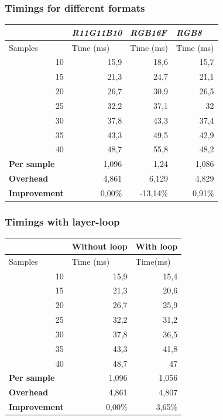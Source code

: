 \documentclass{beamer}
\begin{document}
\begin{frame}
\frametitle{Timings for different formats}
\begin{center}
\begin{tabular}{|r|r|r|r|}
\hline
\multicolumn{1}{|l|}{} & \multicolumn{1}{l|}{\textbf{\textit{R11G11B10}}} & \multicolumn{1}{l|}{\textbf{\textit{RGB16F}}} & \multicolumn{1}{l|}{\textbf{\textit{RGB8}}} \\ \hline
\multicolumn{1}{|l|}{Samples} & \multicolumn{1}{l|}{Time (ms)} & \multicolumn{1}{l|}{Time (ms)} & \multicolumn{1}{l|}{Time (ms)} \\ \hline
10 & 15,9 & 18,6 & 15,7 \\ \hline
15 & 21,3 & 24,7 & 21,1 \\ \hline
20 & 26,7 & 30,9 & 26,5 \\ \hline
25 & 32,2 & 37,1 & 32 \\ \hline
30 & 37,8 & 43,3 & 37,4 \\ \hline
35 & 43,3 & 49,5 & 42,9 \\ \hline
40 & 48,7 & 55,8 & 48,2 \\ \hline
\multicolumn{1}{|l|}{\textbf{Per sample}} & 1,096 & 1,24 & 1,086 \\ \hline
\multicolumn{1}{|l|}{\textbf{Overhead}} & 4,861 & 6,129 & 4,829 \\ \hline
\multicolumn{1}{|l|}{\textbf{Improvement}} & 0,00\% & -13,14\% & 0,91\% \\ \hline
\end{tabular}
\end{center}
\end{frame}


\begin{frame}
\frametitle{Timings with layer-loop}
\begin{center}
\begin{tabular}{|r|r|r|}
\hline
\multicolumn{1}{|l|}{\textbf{}} & \multicolumn{1}{l|}{\textbf{Without loop}} & \multicolumn{1}{l|}{\textbf{With loop}} \\ \hline
\multicolumn{1}{|l|}{Samples} & \multicolumn{1}{l|}{Time (ms)} & \multicolumn{1}{l|}{Time(ms)} \\ \hline
10 & 15,9 & 15,4 \\ \hline
15 & 21,3 & 20,6 \\ \hline
20 & 26,7 & 25,9 \\ \hline
25 & 32,2 & 31,2 \\ \hline
30 & 37,8 & 36,5 \\ \hline
35 & 43,3 & 41,8 \\ \hline
40 & 48,7 & 47 \\ \hline
\multicolumn{1}{|l|}{\textbf{Per sample}} & 1,096 & 1,056 \\ \hline
\multicolumn{1}{|l|}{\textbf{Overhead}} & 4,861 & 4,807 \\ \hline
\multicolumn{1}{|l|}{\textbf{Improvement}} & 0,00\% & 3,65\% \\ \hline
\end{tabular}
\end{center}
\end{frame}
\end{document}
